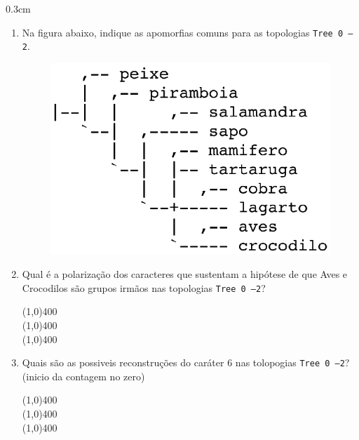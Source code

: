 \begin{refsection}
  \begin {myindentpar}{0.3cm}
  \begin{enumerate}[\itshape i.]
	\item{Na figura abaixo, indique as apomorfias comuns para as topologias \texttt{Tree 0 --2}.}
  \begin{figure}[H]
       \centering
      {\includegraphics[scale=1.00]{figures/tut5/vertebrados_trees_consenso.eps}}\label{tut5:fig:apo_common} 
  \end{figure}

	\item{Qual é a polarização dos caracteres que sustentam a hipótese de que Aves e Crocodilos são grupos irmãos nas topologias \texttt{Tree 0 --2}?}

	   \line(1,0){400}\\
	   \line(1,0){400}\\
	   \line(1,0){400}\\

	\item{Quais são as possiveis reconstruções do caráter 6 nas tolopogias \texttt{Tree 0 --2}? (inicio da contagem no zero)}

	   \line(1,0){400}\\
	   \line(1,0){400}\\
	   \line(1,0){400}\\


\end{enumerate}
\end{myindentpar}
\end{refsection}
